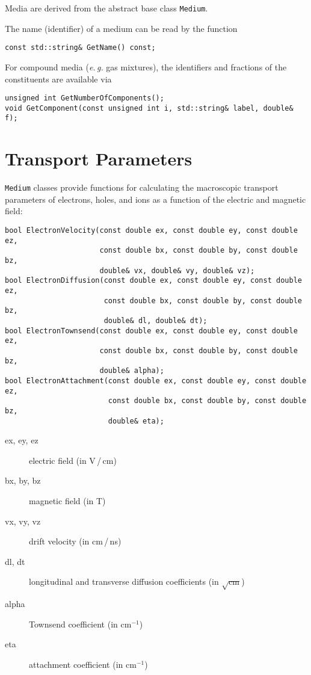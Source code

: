 Media are derived from the abstract base class \texttt{Medium}.

The name (identifier) of a medium can be read by the function
\begin{lstlisting}
const std::string& GetName() const;
\end{lstlisting}
For compound media (\textit{e.\,g.} gas mixtures), 
the identifiers and fractions of the constituents are available via
\begin{lstlisting}
unsigned int GetNumberOfComponents();
void GetComponent(const unsigned int i, std::string& label, double& f);
\end{lstlisting} 

\section{Transport Parameters}

\texttt{Medium} classes provide functions for calculating the 
macroscopic transport 
parameters of electrons, holes, and ions as a function of the 
electric and magnetic field:
\begin{lstlisting}
bool ElectronVelocity(const double ex, const double ey, const double ez,
                      const double bx, const double by, const double bz,
                      double& vx, double& vy, double& vz);
bool ElectronDiffusion(const double ex, const double ey, const double ez,
                       const double bx, const double by, const double bz,
                       double& dl, double& dt);
bool ElectronTownsend(const double ex, const double ey, const double ez,
                      const double bx, const double by, const double bz,
                      double& alpha);
bool ElectronAttachment(const double ex, const double ey, const double ez,
                        const double bx, const double by, const double bz,
                        double& eta);
\end{lstlisting}
\begin{description}
  \item[ex, ey, ez] electric field (in V\,/\,cm)
  \item[bx, by, bz] magnetic field (in T)
  \item[vx, vy, vz] drift velocity (in cm\,/\,ns)
  \item[dl, dt] longitudinal and transverse diffusion coefficients 
     (in \(\sqrt{\text{cm}}\))
  \item[alpha] Townsend coefficient (in \(\text{cm}^{-1}\))
  \item[eta] attachment coefficient (in \(\text{cm}^{-1}\))
\end{description}

